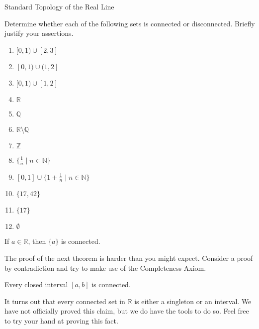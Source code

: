 \begin{section}{Standard Topology of the Real Line}
\begin{problem}
Determine whether each of the following sets is connected or disconnected.  Briefly justify your assertions.
\begin{multicols}{2}
\begin{enumerate}[label=\textrm{(\alph*)}]
\item $[0,1)\cup [2,3]$
\item $[0,1)\cup (1,2]$
\item $[0,1)\cup [1,2]$
\item $\mathbb{R}$
\item $\mathbb{Q}$
\item $\mathbb{R}\setminus\mathbb{Q}$
\item $\mathbb{Z}$
\item $\{\frac{1}{n}\mid n\in\mathbb{N}\}$
\item $[0,1]\cup\{1+\frac{1}{n}\mid n\in\mathbb{N}\}$
\item $\{17,42\}$
\item $\{17\}$
\item $\emptyset$
\end{enumerate}
\end{multicols}
\end{problem}

\begin{theorem}
If $a\in\mathbb{R}$, then $\{a\}$ is connected.
\end{theorem}

The proof of the next theorem is harder than you might expect. Consider a proof by contradiction and try to make use of the Completeness Axiom.

\begin{theorem}\label{thm:closed interval connected}
Every closed interval $[a,b]$ is connected.
\end{theorem}

It turns out that every connected set in $\mathbb{R}$ is either a singleton or an interval. We have not officially proved this claim, but we do have the tools to do so. Feel free to try your hand at proving this fact.



\end{section}
